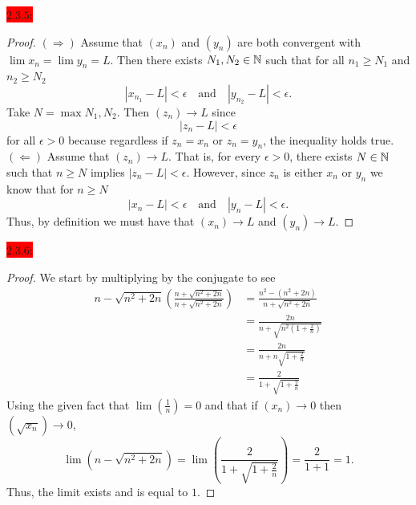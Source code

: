 \documentclass{exam}
\begin{document}
\newpage

\colorbox{red}{\underline{$2.3.5$}:}
\begin{solution}
    \begin{proof}
        $(\Rightarrow)$ Assume that $(x_n)$ and $(y_n)$ are both convergent with $\lim x_n = \lim y_n = L$. Then there exists $N_1, N_2 \in \mathbb N$ such that for all $n_1 \geq N_1$ and $n_2 \geq N_2$ 
        \[
            |x_{n_1} - L| < \epsilon \quad\text{and}\quad |y_{n_2} - L| < \epsilon.
        \]
        Take $N = \max{N_1, N_2}$. Then $(z_n) \to L$ since 
        \[
            |z_n - L| < \epsilon 
        \]
        for all $\epsilon > 0$ because regardless if $z_n = x_n$ or $z_n = y_n$, the inequality holds true. \\
        $(\Leftarrow)$ Assume that $(z_n) \to L$. That is, for every $\epsilon > 0$, there exists $N \in \mathbb N$ such that $n \geq N$ implies $|z_n - L| < \epsilon$. However, since $z_n$ is either $x_n$ or $y_n$ we know that for $n \geq N$
        \[
            |x_{n} - L| < \epsilon \quad\text{and}\quad |y_{n} - L| < \epsilon.
        \]
        Thus, by definition we must have that $(x_n) \to L$ and $(y_n) \to L$.
    \end{proof}
\end{solution}

\colorbox{red}{\underline{$2.3.6$}:}
\begin{solution}
    \begin{proof}
        We start by multiplying by the conjugate to see 
        \begin{align*}
            n - \sqrt{n^2 + 2n}\left(\frac{n + \sqrt{n^2 + 2n}}{n + \sqrt{n^2 + 2n}}\right) &= \frac{n^2 - (n^2 + 2n)}{n + \sqrt{n^2 + 2n}} \\
            &= \frac{2n}{n + \sqrt{n^2\left(1 + \frac{2}{n}\right)}} \\
            &= \frac{2n}{n + n\sqrt{1 + \frac{2}{n}}} \\
            &= \frac{2}{1 + \sqrt{1 + \frac{2}{n}}}
        \end{align*}
        Using the given fact that $\lim (\frac{1}{n}) = 0$ and that if $(x_n) \to 0$ then $(\sqrt{x_n}) \to 0$, 
        \[
            \lim (n - \sqrt{n^2 + 2n}) = \lim\left(\frac{2}{1 + \sqrt{1 + \frac{2}{n}}}\right) = \frac{2}{1 + 1} = 1.
        \]
        Thus, the limit exists and is equal to $1$.
    \end{proof}
\end{solution}

\newpage 
\end{document}
